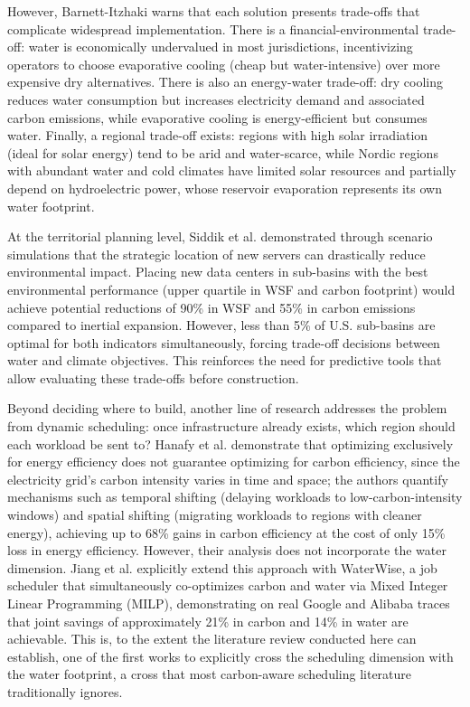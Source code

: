 \documentclass[conference]{IEEEtran}
\begin{document}
However, Barnett-Itzhaki \cite{Barnett2026} warns that each solution presents trade-offs that complicate widespread implementation. There is a financial-environmental trade-off: water is economically undervalued in most jurisdictions, incentivizing operators to choose evaporative cooling (cheap but water-intensive) over more expensive dry alternatives. There is also an energy-water trade-off: dry cooling reduces water consumption but increases electricity demand and associated carbon emissions, while evaporative cooling is energy-efficient but consumes water. Finally, a regional trade-off exists: regions with high solar irradiation (ideal for solar energy) tend to be arid and water-scarce, while Nordic regions with abundant water and cold climates have limited solar resources and partially depend on hydroelectric power, whose reservoir evaporation represents its own water footprint.

At the territorial planning level, Siddik et al. \cite{Siddik2021} demonstrated through scenario simulations that the strategic location of new servers can drastically reduce environmental impact. Placing new data centers in sub-basins with the best environmental performance (upper quartile in WSF and carbon footprint) would achieve potential reductions of 90\% in WSF and 55\% in carbon emissions compared to inertial expansion. However, less than 5\% of U.S. sub-basins are optimal for both indicators simultaneously, forcing trade-off decisions between water and climate objectives. This reinforces the need for predictive tools that allow evaluating these trade-offs before construction.

Beyond deciding where to build, another line of research addresses the problem from dynamic scheduling: once infrastructure already exists, which region should each workload be sent to? Hanafy et al. \cite{Hanafy2023} demonstrate that optimizing exclusively for energy efficiency does not guarantee optimizing for carbon efficiency, since the electricity grid's carbon intensity varies in time and space; the authors quantify mechanisms such as temporal shifting (delaying workloads to low-carbon-intensity windows) and spatial shifting (migrating workloads to regions with cleaner energy), achieving up to 68\% gains in carbon efficiency at the cost of only 15\% loss in energy efficiency. However, their analysis does not incorporate the water dimension. Jiang et al. \cite{Jiang2025WaterWise} explicitly extend this approach with WaterWise, a job scheduler that simultaneously co-optimizes carbon and water via Mixed Integer Linear Programming (MILP), demonstrating on real Google and Alibaba traces that joint savings of approximately 21\% in carbon and 14\% in water are achievable. This is, to the extent the literature review conducted here can establish, one of the first works to explicitly cross the scheduling dimension with the water footprint, a cross that most carbon-aware scheduling literature traditionally ignores.
\end{document}
